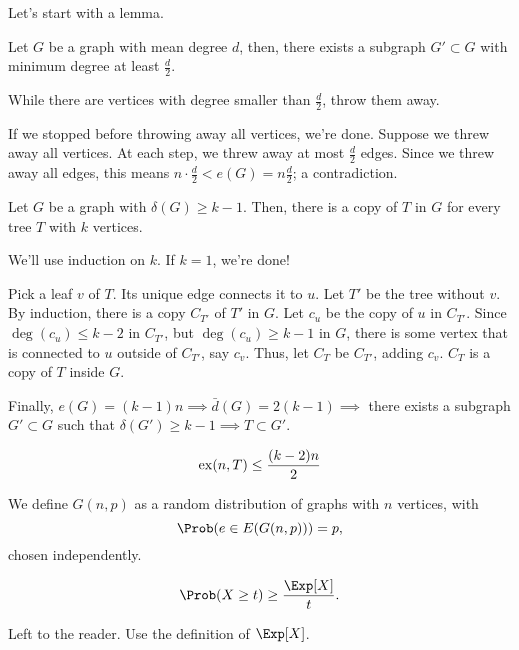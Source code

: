 \begin{dem} Let's start with a lemma.
	\begin{lem}
		Let $G$ be a graph with mean degree $d$, then, there exists a subgraph $G' \subset G$ with minimum degree at least $\frac{d}{2}$.
	\end{lem}
	\begin{dem}
		While there are vertices with degree smaller than $\frac{d}{2}$, throw them away.

		If we stopped before throwing away all vertices, we're done. Suppose we threw away all vertices. At each step, we threw away at most $\frac{d}{2}$ edges. Since we threw away all edges, this means $n \cdot \frac{d}{2} < e(G) = n\frac{d}{2}$; a contradiction.
	\end{dem}

	\begin{lem}
		Let $G$ be a graph with $\delta(G) \ge k - 1$. Then, there is a copy of $T$ in $G$ for every tree $T$ with $k$ vertices.
	\end{lem}

	\begin{dem}
		We'll use induction on $k$. If $k = 1$, we're done!

		Pick a leaf $v$ of $T$. Its unique edge connects it to $u$. Let $T'$ be the tree without $v$. By induction, there is a copy $C_{T'}$ of $T'$ in $G$. Let $c_u$ be the copy of  $u$ in $C_{T'}$. Since $\deg(c_u) \le k - 2$ in $C_{T'}$, but $\deg(c_u) \ge k-1$ in $G$, there is some vertex that is connected to $u$ outside of $C_{T'}$, say $c_v$. Thus, let $C_{T}$ be $C_{T'}$, adding $c_v$. $C_{T}$ is a copy of $T$ inside $G$.
	\end{dem}

	Finally, $e(G) = (k-1)n \implies \bar{d}(G) = 2(k-1) \implies$ there exists a subgraph $G' \subset G$ such that $\delta(G') \ge k - 1 \implies T \subset G'$.
\end{dem}

\begin{conj}
	\[
		\operatorname{ex}(n, T) \le \frac{(k-2)n}{2}
	\]
\end{conj}

\begin{defn}
	We define $G(n, p)$ as a random distribution of graphs with $n$ vertices, with \[
		\Prob(e \in E(G(n, p))) = p,
	\] chosen independently.
\end{defn}

\begin{lem}
	\[
		\Prob(X \ge t) \ge \frac{\Exp[X]}{t}.
	\]
\end{lem}
\begin{dem}
	Left to the reader. Use the definition of $\Exp[X]$.
\end{dem}

